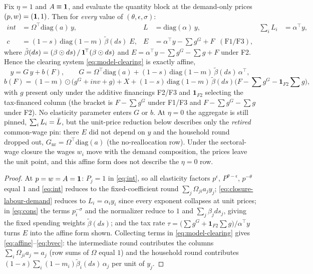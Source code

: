 \begin{lemma}\label{lem:affine}
Fix $\eta = 1$ and $A \equiv \mathbf{1}$, and evaluate the quantity block at the
demand-only prices $(p,w) = (\mathbf{1},1)$. Then for \emph{every} value of
$(\theta,\epsilon,\sigma)$:
\begin{align}
int &= \Omega^{\!\top}\mathrm{diag}(a)\, y, &
L &= \mathrm{diag}(\alpha)\, y, &
\sum_i L_i &= \alpha^{\!\top} y,
\label{eq:leontiefblocks}\\
c &= (1-s)\,\mathrm{diag}(1-m)\,\tilde\beta(ds)\; E, &
E &= \alpha^{\!\top} y - \textstyle\sum g^G + F
   \;\; (\text{F1/F3}), \nonumber
\end{align}
where $\tilde\beta(ds) = (\beta \odot ds)\,/\, \mathbf{1}^{\!\top}(\beta \odot
ds)$ and $E = \alpha^{\!\top} y - \sum g^G - \sum g + F$ under F2. Hence the
clearing system \eqref{eq:model-clearing} is exactly affine,
\begin{equation}
y = G\, y + b(F),
\qquad
G = \Omega^{\!\top}\mathrm{diag}(a)
  + (1-s)\,\mathrm{diag}(1-m)\,\tilde\beta(ds)\,\alpha^{\!\top},
\label{eq:affine}
\end{equation}
\begin{equation}
b(F) = (1-m)\odot\big( g^G + inv + g \big) + X
     + (1-s)\,\mathrm{diag}(1-m)\,\tilde\beta(ds)
       \big( F - \textstyle\sum g^G - \mathbf{1}_{F2}\textstyle\sum g \big),
\label{eq:bvec}
\end{equation}
with $g$ present only under the additive financings
F2/F3 and $\mathbf{1}_{F2}$ selecting the tax-financed column (the bracket is
$F-\sum g^G$ under F1/F3 and $F-\sum g^G-\sum g$ under F2).
No elasticity parameter enters $G$ or $b$. At
$\eta = 0$ the aggregate is still pinned, $\sum_i L_i = \bar{L}$, but the
unit-price reduction below describes only the \emph{retired} common-wage
pin: there $E$ did not depend on $y$ and the household round dropped out,
$G_{\mathrm{nr}} = \Omega^{\!\top}\mathrm{diag}(a)$ (the no-reallocation
row). Under the sectoral-wage
closure the wages $w_i$ move with the demand composition, the prices leave
the unit point, and this affine form does not describe the $\eta = 0$ row.
\end{lemma}

\begin{proof}
At $p = w = A = \mathbf{1}$: $P_j = 1$ in \eqref{eq:int}, so all elasticity
factors $p^{\epsilon}$, $P^{\theta-\epsilon}$, $p^{-\theta}$ equal $1$ and
\eqref{eq:int} reduces to the fixed-coefficient round
$\sum_j \Omega_{ji} a_j y_j$; \eqref{eq:closure-labour-demand} reduces to
$L_i = \alpha_i y_i$ since every exponent collapses at unit prices; in
\eqref{eq:cons} the terms $p_i^{-\sigma}$ and the normalizer reduce to
$1$ and $\sum_j \beta_j ds_j$, giving the fixed spending weights
$\tilde\beta(ds)$; and the tax rate $\tau = \bigl(\sum g^G + \mathbf{1}_{F2}\sum g\bigr) / \alpha^{\!\top}y$
turns $E$ into the affine form shown. Collecting terms in
\eqref{eq:model-clearing} gives \eqref{eq:affine}--\eqref{eq:bvec}: the
intermediate round contributes the columns
$\sum_i \Omega_{ji} a_j = a_j$ (row sums of $\Omega$ equal $1$) and the
household round contributes $(1-s)\sum_i (1-m_i)\tilde\beta_i(ds)\,
\alpha_j$ per unit of $y_j$.
\end{proof}


